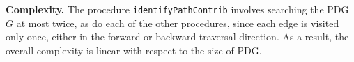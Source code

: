 

\textbf{Complexity.}
The procedure \texttt{identifyPathContrib} involves searching the PDG $G$ at most twice, as do each of the other procedures, since each edge is visited only once, either in the forward or backward traversal direction. As a result, the overall complexity is linear with respect to the size of PDG.



